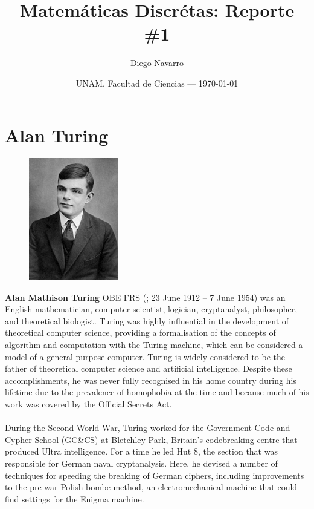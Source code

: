 \documentclass{article}
\title{Matem\'{a}ticas Discr\'{e}tas: Reporte \#1} %
\author{Diego Navarro}
\date{UNAM, Facultad de Ciencias --- \today}
\begin{document}
\maketitle
\pagebreak


\section*{Alan Turing}
\begin{figure}
  \includegraphics[width=0.35\textwidth]{turing}
\end{figure}
\textbf{Alan Mathison Turing} OBE FRS (; 23 June 1912 – 7 June 1954) was an English mathematician, computer scientist, logician, cryptanalyst, philosopher, and theoretical biologist. Turing was highly influential in the development of theoretical computer science, providing a formalisation of the concepts of algorithm and computation with the Turing machine, which can be considered a model of a general-purpose computer. Turing is widely considered to be the father of theoretical computer science and artificial intelligence. Despite these accomplishments, he was never fully recognised in his home country during his lifetime due to the prevalence of homophobia at the time and because much of his work was covered by the Official Secrets Act.\\
\\
During the Second World War, Turing worked for the Government Code and Cypher School (GC\&CS) at Bletchley Park, Britain's codebreaking centre that produced Ultra intelligence. For a time he led Hut 8, the section that was responsible for German naval cryptanalysis. Here, he devised a number of techniques for speeding the breaking of German ciphers, including improvements to the pre-war Polish bombe method, an electromechanical machine that could find settings for the Enigma machine.\\
\end{document}
